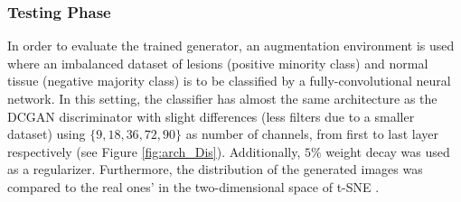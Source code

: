 \documentclass[final,3p,twocolumn,authoryear,sort&compress,times]{maia}
\begin{document}
\subsubsection{Testing Phase}
\label{sec:eval_testing_phase}
In order to evaluate the trained generator, an augmentation environment is used where an imbalanced dataset of lesions (positive minority class) and normal tissue (negative majority class) is to be classified by a fully-convolutional neural network. In this setting, the classifier has almost the same architecture as the DCGAN discriminator with slight differences (less filters due to a smaller dataset) using $\{9, 18, 36, 72, 90\}$ as number of channels, from first to last layer respectively (see Figure \ref{fig:arch_Dis}). Additionally, $5\%$ weight decay was used as a regularizer. Furthermore, the distribution of the generated images was compared to the real ones' in the two-dimensional space of t-SNE \citep{t_SNE}.
\end{document}
